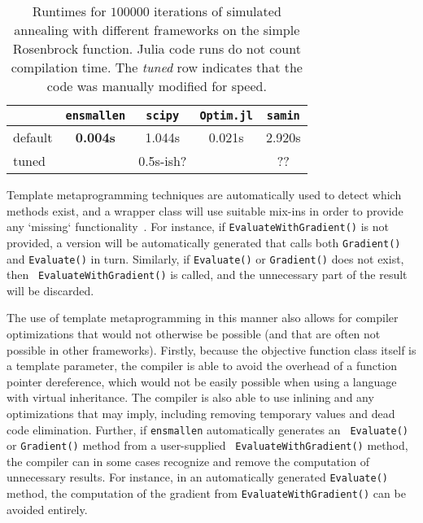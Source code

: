 \documentclass{article}
\begin{document}
\begin{table}[t]
\begin{center}
\begin{tabular}{lcccc}
\toprule
 & {\tt ensmallen} & {\tt scipy} & {\tt Optim.jl} & {\tt samin} \\
\midrule
default & {\bf 0.004s} & 1.044s & 0.021s & 2.920s \\
tuned & & 0.5s-ish? & & ?? \\ %
\bottomrule
\end{tabular}
\end{center}
\caption{Runtimes for $100000$ iterations of simulated annealing with different
frameworks on the simple Rosenbrock function.  Julia code runs do not count
compilation time.  The {\it tuned} row indicates that the code was manually
modified for speed.}
\label{tab:rosenbrock_results}
\end{table}

Template metaprogramming techniques are automatically used to
detect which methods exist, and a wrapper class will use suitable mix-ins in
order to provide any `missing` functionality~\cite{smaragdakis2000mixin}.  For
instance, if {\tt EvaluateWithGradient()} is not provided, a version will be
automatically generated that calls both {\tt Gradient()} and {\tt Evaluate()} in turn.
Similarly, if {\tt Evaluate()} or {\tt Gradient()} does not exist, then {\tt
EvaluateWithGradient()} is called, and the unnecessary part of the result will
be discarded.

The use of template metaprogramming in this manner also allows for compiler optimizations that
would not otherwise be possible (and that are often not possible in other
frameworks).  Firstly, because the objective function class itself is a template
parameter, the compiler is able to avoid the overhead of a function pointer
dereference, which would not be easily possible when using a language with
virtual inheritance.  The compiler is also able to use inlining and any
optimizations that may imply, including removing temporary values and dead code
elimination.  Further, if {\tt ensmallen} automatically generates an {\tt
Evaluate()} or {\tt Gradient()} method from a user-supplied {\tt
EvaluateWithGradient()} method, the compiler can in some cases recognize and
remove the computation of unnecessary results.  For instance, in an
automatically generated {\tt Evaluate()} method, the computation of the gradient
from {\tt EvaluateWithGradient()} can be avoided entirely.
\end{document}
